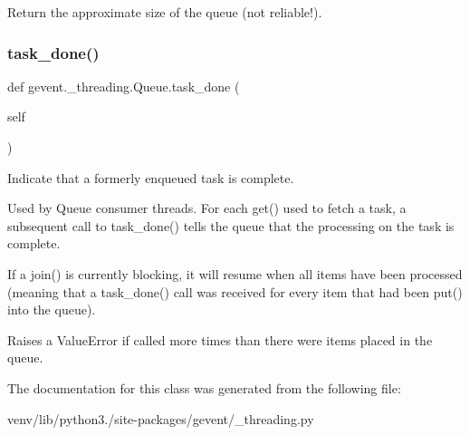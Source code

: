 \begin{DoxyVerb}Return the approximate size of the queue (not reliable!).\end{DoxyVerb}
 \mbox{\label{classgevent_1_1__threading_1_1_queue_ac2bdb2617cbb9f62a7ee9d68b8871144}} 
\subsubsection{\texorpdfstring{task\+\_\+done()}{task\_done()}}
{\footnotesize\ttfamily def gevent.\+\_\+threading.\+Queue.\+task\+\_\+done (\begin{DoxyParamCaption}\item[{}]{self }\end{DoxyParamCaption})}

\begin{DoxyVerb}Indicate that a formerly enqueued task is complete.

Used by Queue consumer threads.  For each get() used to fetch a task,
a subsequent call to task_done() tells the queue that the processing
on the task is complete.

If a join() is currently blocking, it will resume when all items
have been processed (meaning that a task_done() call was received
for every item that had been put() into the queue).

Raises a ValueError if called more times than there were items
placed in the queue.
\end{DoxyVerb}
 

The documentation for this class was generated from the following file\+:\begin{DoxyCompactItemize}
\item 
venv/lib/python3./site-\/packages/gevent/\+\_\+threading.\+py\end{DoxyCompactItemize}
